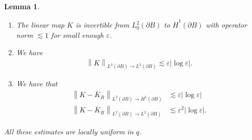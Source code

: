 \documentclass[10pt]{amsart}
\let\epsilon\varepsilon
\newtheorem{lemma}[theorem]{Lemma}
\theoremstyle{definition}
\newcommand\norm[1]{\left\lVert #1\right\rVert}
\let\de\partial
\let\eps\epsilon
\begin{document}
\skpt\begin{lemma}\label{K bd}
\begin{enumerate}
\item\label{K bda}
The linear map $K$ is invertible from $L_0^2(\de B)$ to $\dot{H}^1(\de B)$ with operator norm $\lesssim 1$ for small enough $\eps$.
\item\label{K bdb}
We have
\begin{align*}
\norm{K}_{L^2(\de B)\to L^2(\de B)}\lesssim \eps|{\log\eps}|.
\end{align*}
\item\label{K bdc}
We have that
\begin{align*}
\norm{K-\overline{K}_R}_{L^2(\de B)\to H^1(\de B)}&\lesssim \eps|{\log\eps}|\\
\tag*{and}
\norm{K-\overline{K}_R}_{L^2(\de B)\to L^2(\de B)}&\lesssim \eps^2|{\log\eps}|.
\end{align*}
\end{enumerate}
All these estimates are locally uniform in $q$.
\end{lemma}
\end{document}
